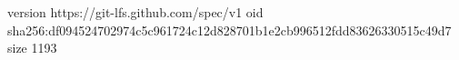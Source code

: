 version https://git-lfs.github.com/spec/v1
oid sha256:df094524702974c5c961724c12d828701b1e2cb996512fdd83626330515c49d7
size 1193
